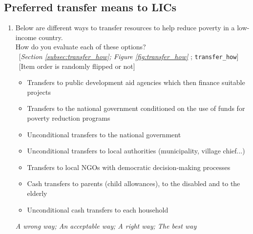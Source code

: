  \subsection*{Preferred transfer means to LICs} 
 \begin{enumerate}[resume] 
\item  \label{q:transfer_how} Below are different ways to transfer resources to help reduce poverty in a low-income country.~\\How do you evaluate each of these options?\\ 
~[\textit{Section \ref{subsec:transfer_how}; Figure \ref{fig:transfer_how}%
}; 
\verb|transfer_how|]
~[Item order is randomly flipped or not]
\begin{itemize}
  \item Transfers to public development aid agencies which then finance suitable projects
  \item Transfers to the national government conditioned on the use of funds for poverty reduction programs
  \item Unconditional transfers to the national government
  \item Unconditional transfers to local authorities (municipality, village chief...)
  \item Transfers to local NGOs with democratic decision-making processes
  \item Cash transfers to parents (child allowances), to the disabled and to the elderly
  \item Unconditional cash transfers to each household
\end{itemize}
\textit{A wrong way; An acceptable way; A right way; The best way}

\end{enumerate} 

